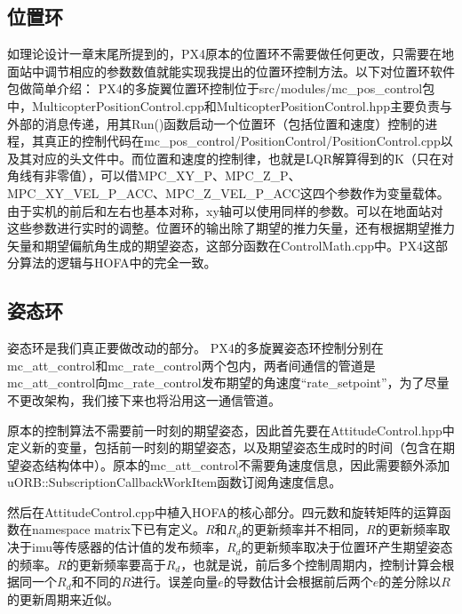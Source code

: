 \subsection*{位置环}
如理论设计一章末尾所提到的，PX4原本的位置环不需要做任何更改，只需要在地面站中调节相应的参数数值就能实现我提出的位置环控制方法。以下对位置环软件包做简单介绍：
PX4的多旋翼位置环控制位于src/modules/mc\_pos\_control包中，MulticopterPositionControl.cpp和MulticopterPositionControl.hpp主要负责与外部的消息传递，用其Run()函数启动一个位置环（包括位置和速度）控制的进程，其真正的控制代码在mc\_pos\_control/PositionControl/PositionControl.cpp以及其对应的头文件中。而位置和速度的控制律，也就是LQR解算得到的K（只在对角线有非零值），可以借MPC\_XY\_P、MPC\_Z\_P、MPC\_XY\_VEL\_P\_ACC、MPC\_Z\_VEL\_P\_ACC这四个参数作为变量载体。由于实机的前后和左右也基本对称，xy轴可以使用同样的参数。可以在地面站对这些参数进行实时的调整。位置环的输出除了期望的推力矢量，还有根据期望推力矢量和期望偏航角生成的期望姿态，这部分函数在ControlMath.cpp中。PX4这部分算法的逻辑与HOFA中的完全一致。






\subsection*{姿态环}
姿态环是我们真正要做改动的部分。
PX4的多旋翼姿态环控制分别在mc\_att\_control和mc\_rate\_control两个包内，两者间通信的管道是mc\_att\_control向mc\_rate\_control发布期望的角速度“rate\_setpoint”，为了尽量不更改架构，我们接下来也将沿用这一通信管道。

原本的控制算法不需要前一时刻的期望姿态，因此首先要在AttitudeControl.hpp中定义新的变量，包括前一时刻的期望姿态，以及期望姿态生成时的时间（包含在期望姿态结构体中）。原本的mc\_att\_control不需要角速度信息，因此需要额外添加uORB::SubscriptionCallbackWorkItem函数订阅角速度信息。

然后在AttitudeControl.cpp中植入HOFA的核心部分。四元数和旋转矩阵的运算函数在namespace matrix下已有定义。$R$和$R_d$的更新频率并不相同，$R$的更新频率取决于imu等传感器的估计值的发布频率，$R_d$的更新频率取决于位置环产生期望姿态的频率。$R$的更新频率要高于$R_d$，也就是说，前后多个控制周期内，控制计算会根据同一个$R_d$和不同的$R$进行。误差向量$e$的导数估计会根据前后两个$e$的差分除以$R$的更新周期来近似。

